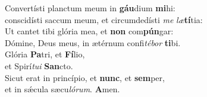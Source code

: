 \evenverse Convertísti planctum meum in \textbf{gáu}dium \textbf{mi}hi:~\*\\
\evenverse conscidísti saccum meum, et circumdedísti \textit{me} \textit{læ}\textbf{tí}tia:\\
\oddverse Ut cantet tibi glória mea, et \textbf{non} com\textbf{pún}gar:~\*\\
\oddverse Dómine, Deus meus, in ætérnum confi\textit{té}\textit{bor} \textbf{ti}bi.\\
\evenverse Glória \textbf{Pa}tri, et \textbf{Fí}lio,~\*\\
\evenverse et Spirí\textit{tu}\textit{i} \textbf{San}cto.\\
\oddverse Sicut erat in princípio, et \textbf{nunc}, et \textbf{sem}per,~\*\\
\oddverse et in sǽcula sæcu\textit{ló}\textit{rum}. \textbf{A}men.\\
